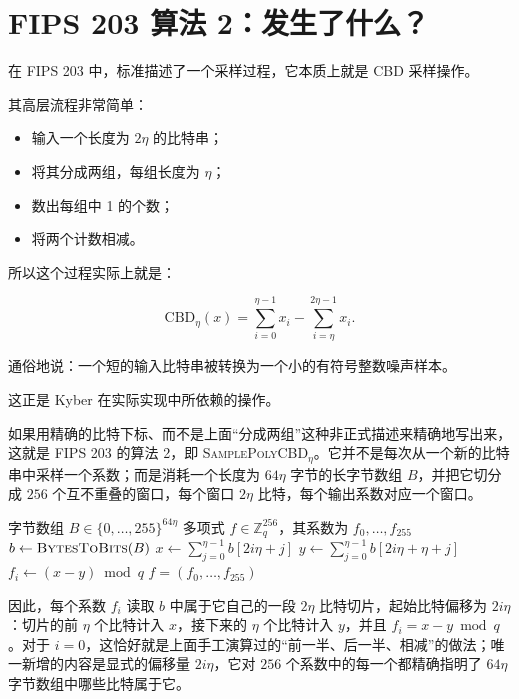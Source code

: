 \section{FIPS 203 算法 2：发生了什么？}

在 FIPS 203 中，标准描述了一个采样过程，它本质上就是 CBD 采样操作。

其高层流程非常简单：

\begin{itemize}
  \item 输入一个长度为 \(2\eta\) 的比特串；
  \item 将其分成两组，每组长度为 \(\eta\)；
  \item 数出每组中 1 的个数；
  \item 将两个计数相减。
\end{itemize}

所以这个过程实际上就是：

\[
\text{CBD}_{\eta}(x) = \sum_{i=0}^{\eta-1} x_i - \sum_{i=\eta}^{2\eta-1} x_i.
\]

通俗地说：一个短的输入比特串被转换为一个小的有符号整数噪声样本。

这正是 Kyber 在实际实现中所依赖的操作。

如果用精确的比特下标、而不是上面“分成两组”这种非正式描述来精确地写出来，这就是 FIPS 203 的算法 2，即 \textsc{SamplePolyCBD}$_\eta$。它并不是每次从一个新的比特串中采样一个系数；而是消耗一个长度为 $64\eta$ 字节的长字节数组 $B$，并把它切分成 $256$ 个互不重叠的窗口，每个窗口 $2\eta$ 比特，每个输出系数对应一个窗口。

\begin{algorithm}[H]
\caption{SamplePolyCBD$_\eta$（FIPS 203，算法 2）}
\label{alg:samplepolycbd}
\begin{algorithmic}[1]
\Require 字节数组 $B \in \{0,\dots,255\}^{64\eta}$
\Ensure 多项式 $f \in \mathbb{Z}_q^{256}$，其系数为 $f_0,\dots,f_{255}$
\State $b \gets \textsc{BytesToBits}(B)$ 
    \State $x \gets \sum_{j=0}^{\eta-1} b[2i\eta + j]$ 
    \State $y \gets \sum_{j=0}^{\eta-1} b[2i\eta + \eta + j]$ 
    \State $f_i \gets (x - y) \bmod q$
\EndFor
\State \Return $f = (f_0,\dots,f_{255})$
\end{algorithmic}
\end{algorithm}

因此，每个系数 $f_i$ 读取 $b$ 中属于它自己的一段 $2\eta$ 比特切片，起始比特偏移为 $2i\eta$：切片的前 $\eta$ 个比特计入 $x$，接下来的 $\eta$ 个比特计入 $y$，并且 $f_i=x-y \bmod q$。对于 $i=0$，这恰好就是上面手工演算过的“前一半、后一半、相减”的做法；唯一新增的内容是显式的偏移量 $2i\eta$，它对 $256$ 个系数中的每一个都精确指明了 $64\eta$ 字节数组中哪些比特属于它。

